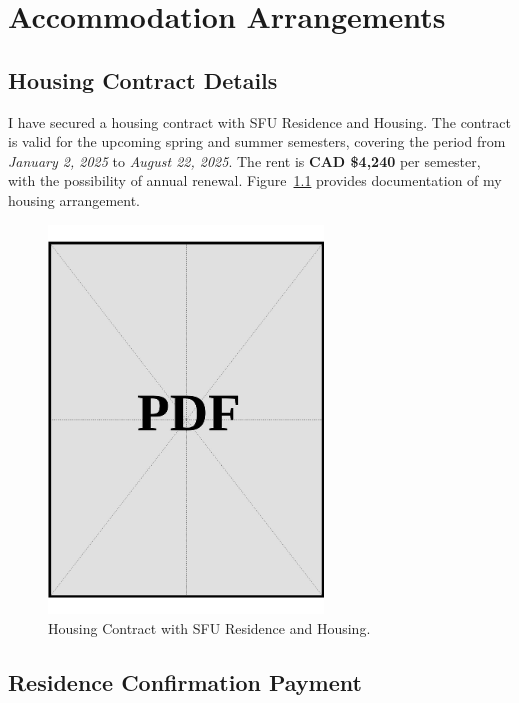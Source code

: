 \chapter{Accommodation Arrangements}
\label{sec:housing-proof}

\section{Housing Contract Details}
\label{sec:sfu-housing-contract}

\noindent
I have secured a housing contract with SFU Residence and Housing. The contract is valid for the upcoming spring and summer semesters, covering the period from \textit{January 2, 2025} to \textit{August 22, 2025}. The rent is \textbf{CAD \$4,240} per semester, with the possibility of annual renewal. Figure~\ref{fig:sfu-housing-contract} provides documentation of my housing arrangement.

\vspace*{\fill}
\begin{figure}[ht]
    \centering
    \includegraphics[page=1,width=0.65\textwidth]{../docs/applicant/proof-of-housing-arrangement/contract.pdf}
    \caption{Housing Contract with SFU Residence and Housing.}
    \label{fig:sfu-housing-contract}
\end{figure}
\vspace*{\fill}
\clearpage

\section{Residence Confirmation Payment}
\label{sec:residence-confirmation-payment}

